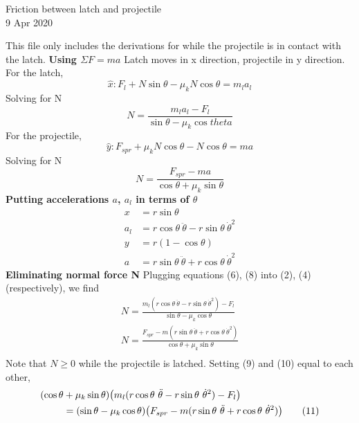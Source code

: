 \documentclass[12pt]{article}
\begin{document}
\begin{center}
    Friction between latch and projectile \\
    9 Apr 2020
\end{center}


\noindent This file only includes the derivations for while the projectile is in contact with the latch.
\newline
\noindent \textbf{Using $\Sigma F = ma$}
\newline
Latch moves in x direction, projectile in y direction.
\newline
For the latch,
\[ \tag{1}
    \hat{x}: F_l + N \sin{\theta} - \mu_k N \cos{\theta} = m_l a_l
\]
Solving for N
\[\tag{2}
    N = \frac{m_l a_l - F_l}{\sin{\theta} - \mu_k \cos{theta}}
\]
\newline
For the projectile,
\[\tag{3}
    \hat{y}: F_{spr} + \mu_k N \cos{\theta} - N \cos{\theta} = m a
\]
Solving for N
\[\tag{4}
    N = \frac{F_{spr} - ma}{\cos{\theta} + \mu_k \sin{\theta}}
\]
\newline
\noindent \textbf{Putting accelerations $a$, $a_l$ in terms of $\theta$}
\newline
\begin{align}
    x & = r \sin{\theta} \tag{5} \\
    a_l & = r \cos{\theta} \  \ddot{\theta} - r \sin{\theta} \  \dot{\theta}^2 \tag{6} \\
    y & = r (1 - \cos{\theta}) \tag{7} \\
    a & = r \sin{\theta} \  \ddot{\theta} + r \cos{\theta} \  \dot{\theta}^2 \tag{8}
\end{align}
\newline
\noindent \textbf{Eliminating normal force N}
\newline
Plugging equations (6), (8) into (2), (4) (respectively), we find
\begin{align}
    N = \frac{m_l (r \cos{\theta} \  \ddot{\theta} - r \sin{\theta} \  \dot{\theta}^2) - F_l}{\sin{\theta} - \mu_k \cos{\theta}} \tag{9} \\
    N = \frac{F_{spr} - m (r \sin{\theta} \  \ddot{\theta} + r \cos{\theta} \  \dot{\theta}^2)}{\cos{\theta} + \mu_k \sin{\theta}} \tag{10} \\
\end{align}
Note that $N \geq 0$ while the projectile is latched.
\newline
\newline
Setting (9) and (10) equal to each other,
\begin{align}
    (\cos{\theta} & + \mu_k \sin{\theta}) \bigl( m_l (r \cos{\theta} \  \ddot{\theta} - r \sin{\theta} \  \dot{\theta}^2) - F_l \bigr) \notag \\
    & = (\sin{\theta} - \mu_k \cos{\theta}) \bigl(F_{spr} - m (r \sin{\theta} \  \ddot{\theta} + r \cos{\theta} \  \dot{\theta}^2) \bigr) \tag{11}
\end{align}
\end{document}
